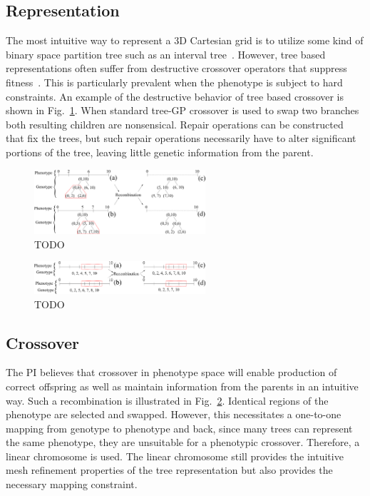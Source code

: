 \documentclass[conference]{IEEEtran}
\begin{document}
\subsection{Representation}
The most intuitive way to represent a 3D Cartesian grid is to utilize some kind of binary space partition tree such as an interval tree~\cite{ref:Franco1985}. However, tree based representations often suffer from destructive crossover operators that suppress fitness~\cite{ref:Sheneman2006}. This is particularly prevalent when the phenotype is subject to hard constraints. An example of the destructive behavior of tree based crossover is shown in Fig.~\ref{fig:treefail}. When standard tree-GP crossover is used to swap two branches both resulting children are nonsensical. Repair operations can be constructed that fix the trees, but such repair operations necessarily have to alter significant portions of the tree, leaving little genetic information from the parent.
\begin{figure}[!t]
\centering
\includegraphics[width=2.5in]{treefail}
\caption{TODO}
\label{fig:treefail}
\end{figure}

\begin{figure}[!t]
\centering
\includegraphics[width=2.5in]{linearxover}
\caption{TODO}
\label{fig:linearxover}
\end{figure}

\subsection{Crossover}
The PI believes that crossover in phenotype space will enable production of correct offspring as well as maintain information from the parents in an intuitive way. Such a recombination is illustrated in Fig.~\ref{fig:linearxover}. Identical regions of the phenotype are selected and swapped. However, this necessitates a one-to-one mapping from genotype to phenotype and back, since many trees can represent the same phenotype, they are unsuitable for a phenotypic crossover. Therefore, a linear chromosome is used. The linear chromosome still provides the intuitive mesh refinement properties of the tree representation but also provides the necessary mapping constraint.
\end{document}
